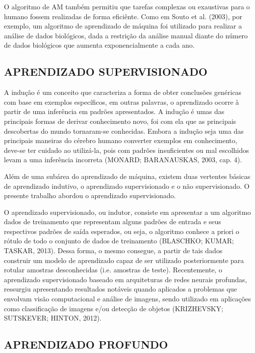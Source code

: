 O algoritmo de AM também permitiu que tarefas complexas ou exaustivas para o humano fossem realizadas de forma eficiênte. Como em Souto et al. (2003), por exemplo, um algoritmo de aprendizado de máquina foi utilizado para realizar a análise de dados biológicos, dada a restrição da análise manual diante do número de dados biológicos que aumenta exponencialmente a cada ano.


\subsection{APRENDIZADO SUPERVISIONADO}
\label{sec:titSecAprenSupervisionado}

A indução é um conceito que caracteriza a forma de obter conclusões genéricas com base em exemplos específicos, em outras palavras, o aprendizado ocorre à partir de uma inferência em padrões apresentados. A indução é umas das principais formas de derivar conhecimento novo, foi com ela que as principais descobertas do mundo tornaram-se conhecidas. Embora a indução seja uma das principais maneiras do cérebro humano converter exemplos em conhecimento, deve-se ter cuidado ao utilizá-la, pois com padrões insuficientes ou mal escolhidos levam a uma inferência incorreta (MONARD; BARANAUSKAS, 2003, cap. 4).	

Além de uma subárea do aprendizado de máquina, existem duas vertentes básicas de aprendizado indutivo, o aprendizado supervisionado e o não supervisionado. O presente trabalho abordou o aprendizado supervisionado.

O aprendizado supervisionado, ou indutor, consiste em apresentar a um algoritmo dados de treinamento que representam alguns padrões de entrada e seus respectivos padrões de saída esperados, ou seja, o algoritmo conhece a priori o rótulo de todo o conjunto de dados de treinamento (BLASCHKO; KUMAR; TASKAR, 2013). Dessa forma, o mesmo consegue, a partir de tais dados construir um modelo de aprendizado capaz de ser utilizado posteriormente para rotular amostras desconhecidas (i.e. amostras de teste). Recentemente, o aprendizado supervisionado baseado em arquiteturas de redes neurais profundas, ressurgiu apresentando resultados notáveis quando aplicados a problemas que envolvam visão computacional e análise de imagens, sendo utilizado em aplicações como classificação de imagens e/ou detecção de objetos (KRIZHEVSKY; SUTSKEVER; HINTON, 2012).


\subsection{APRENDIZADO PROFUNDO}
\label{sec:titSecAprenProfundo}

